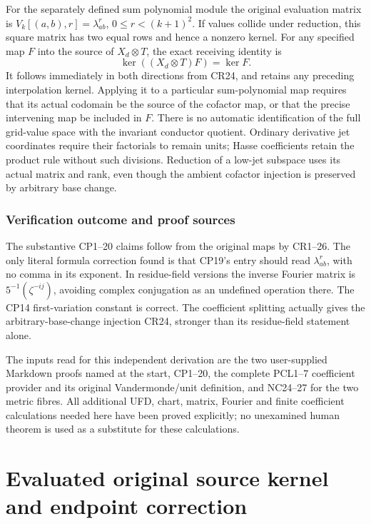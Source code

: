 \documentclass[11pt]{article}
\begin{document}
For the separately defined sum polynomial module the original
evaluation matrix is
$V_k[(a,b),r]=\lambda_{ab}^{r}$, $0\le r<(k+1)^2$.
If values collide under reduction, this square matrix has two
equal rows and hence a nonzero kernel.  For any specified map
$F$ into the source of $X_d\otimes T$, the exact receiving
identity is
\[
 \ker((X_d\otimes T)F)=\ker F.                                \tag{CR26}
\]
It follows immediately in both directions from CR24, and retains
any preceding interpolation kernel.  Applying it to a particular
sum-polynomial map requires that its actual codomain be the
source of the cofactor map, or that the precise intervening map
be included in $F$.  There is no automatic identification of
the full grid-value space with the invariant conductor quotient.
Ordinary derivative jet coordinates require their factorials
to remain units; Hasse coefficients retain the product rule
without such divisions.  Reduction of a low-jet subspace uses
its actual matrix and rank, even though the ambient cofactor
injection is preserved by arbitrary base change.

\section{Verification outcome and proof sources}
The substantive CP1--20 claims follow from the original maps by
CR1--26.  The only literal formula correction found is that CP19's
entry should read $\lambda_{ab}^{r}$, with no comma in its exponent.
In residue-field versions the inverse Fourier matrix is
$5^{-1}(\zeta^{-ij})$, avoiding complex conjugation as an undefined
operation there.  The CP14 first-variation constant is correct.
The coefficient splitting actually gives the arbitrary-base-change
injection CR24, stronger than its residue-field statement alone.

The inputs read for this independent derivation are the two
user-supplied Markdown proofs named at the start, CP1--20,
the complete PCL1--7 coefficient provider and its original
Vandermonde/unit definition, and NC24--27 for the two metric
fibres.  All additional UFD, chart, matrix, Fourier and finite
coefficient calculations needed here have been proved explicitly;
no unexamined human theorem is used as a substitute for these
calculations.

\endgroup

\clearpage\begingroup
\part*{Evaluated original source kernel and endpoint correction}
\providecommand{\pkerneltightlist}{\setlength{\itemsep}{0pt}\setlength{\parskip}{0pt}}
\newcommand{\pkerneldiag}{\operatorname{diag}}
\newcommand{\pkernelrank}{\operatorname{rank}}
\newcommand{\pkernelTr}{\operatorname{Tr}}
\end{document}
